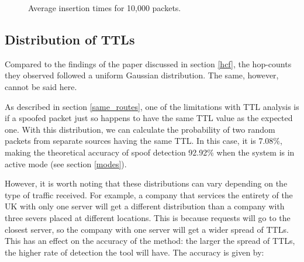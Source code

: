 \documentclass[12pt,twoside]{article}
\begin{document}
\begin{figure}[h]
	\centering
	\qquad
	\caption{Average insertion times for 10,000 packets.}
	\label{ttl_count_prob}
\end{figure}

\subsection{Distribution of TTLs}
Compared to the findings of the paper discussed in section \ref{hcf}, the hop-counts they observed followed a uniform Gaussian distribution. The same, however, cannot be said here.

As described in section \ref{same_routes}, one of the limitations with TTL analysis is if a spoofed packet just so happens to have the same TTL value as the expected one. With this distribution, we can calculate the probability of two random packets from separate sources having the same TTL. In this case, it is 7.08\%, making the theoretical accuracy of spoof detection 92.92\% when the system is in active mode (see section \ref{modes}).

However, it is worth noting that these distributions can vary depending on the type of traffic received. For example, a company that services the entirety of the UK with only one server will get a different distribution than a company with three severs placed at different locations. This is because requests will go to the closest server, so the company with one server will get a wider spread of TTLs. This has an effect on the accuracy of the method: the larger the spread of TTLs, the higher rate of detection the tool will have. The accuracy is given by:
\end{document}
